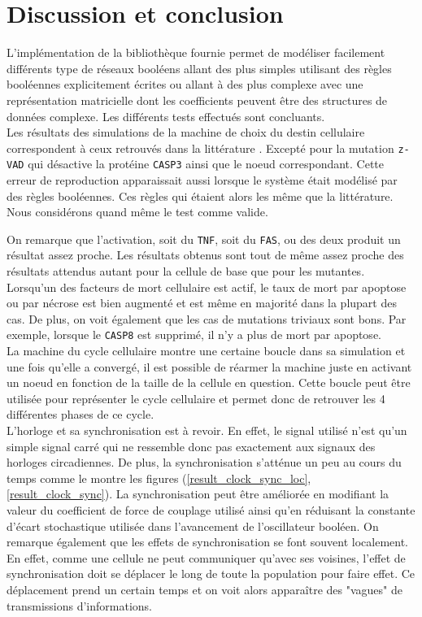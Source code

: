 \documentclass[11pt, a4paper]{article}
\begin{document}
\newpage
\section{Discussion et conclusion}
L'implémentation de la bibliothèque fournie permet de modéliser facilement
différents type de réseaux booléens allant des plus simples utilisant des
règles booléennes explicitement écrites ou allant à des plus complexe avec une
représentation matricielle dont les coefficients peuvent être des structures de
données complexe. Les différents tests effectués sont concluants. \\

Les résultats des simulations de la machine de choix du destin cellulaire
correspondent à ceux retrouvés dans la littérature \cite{calzone2010}. Excepté
pour la mutation \texttt{z-VAD} qui désactive la protéine \texttt{CASP3} ainsi
que le noeud correspondant. Cette erreur de reproduction apparaissait aussi
lorsque le système était modélisé par des règles booléennes. Ces règles qui
étaient alors les même que la littérature. Nous considérons quand même le test
comme valide.

On remarque que l'activation, soit du \texttt{TNF}, soit du \texttt{FAS}, ou
des deux produit un résultat assez proche. Les résultats obtenus sont tout de
même assez proche des résultats attendus autant pour la cellule de base que
pour les mutantes. Lorsqu'un des facteurs de mort cellulaire est actif, le taux
de mort par apoptose ou par nécrose est bien augmenté et est même en majorité
dans la plupart des cas. De plus, on voit également que les cas de mutations
triviaux sont bons. Par exemple, lorsque le \texttt{CASP8} est supprimé, il n'y
a plus de mort par apoptose. \\

La machine du cycle cellulaire montre une certaine boucle dans sa simulation et
une fois qu'elle a convergé, il est possible de réarmer la machine juste en
activant un noeud en fonction de la taille de la cellule en question. Cette
boucle peut être utilisée pour représenter le cycle cellulaire et permet donc
de retrouver les 4 différentes phases de ce cycle. \\

L'horloge et sa synchronisation est à revoir. En effet, le signal utilisé n'est
qu'un simple signal carré qui ne ressemble donc pas exactement aux signaux des
horloges circadiennes. De plus, la synchronisation s'atténue un peu au cours du
temps comme le montre les figures (\ref{result_clock_sync_loc},
\ref{result_clock_sync}). La synchronisation peut être améliorée en modifiant
la valeur du coefficient de force de couplage utilisé ainsi  qu'en réduisant
la constante d'écart stochastique utilisée dans l'avancement de l'oscillateur
booléen. On remarque également que les effets de synchronisation se font
souvent localement. En effet, comme une cellule ne peut communiquer qu'avec ses
voisines, l'effet de synchronisation doit se déplacer le long de toute la
population pour faire effet. Ce déplacement prend un certain temps et on voit
alors apparaître des "vagues" de transmissions d'informations. \\
\end{document}

